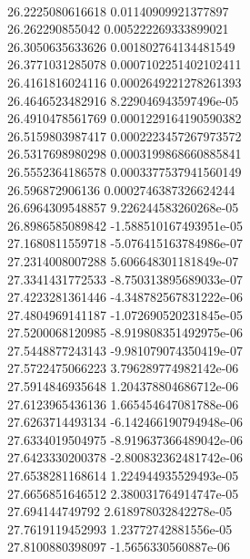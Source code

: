 { \\
26.2225080616618 0.01140909921377897
 \\
26.262290855042 0.005222269333899021
 \\
26.3050635633626 0.001802764134481549
 \\
26.3771031285078 0.0007102251402102411
 \\
26.4161816024116 0.0002649221278261393
 \\
26.4646523482916 8.229046943597496e-05
 \\
26.4910478561769 0.0001229164190590382
 \\
26.5159803987417 0.0002223457267973572
 \\
26.5317698980298 0.0003199868660885841
 \\
26.5552364186578 0.0003377537941560149
 \\
26.596872906136 0.0002746387326624244
 \\
26.6964309548857 9.226244583260268e-05
 \\
26.8986585089842 -1.588510167493951e-05
 \\
27.1680811559718 -5.076415163784986e-07
 \\
27.2314008007288 5.606648301181849e-07
 \\
27.3341431772533 -8.750313895689033e-07
 \\
27.4223281361446 -4.348782567831222e-06
 \\
27.4804969141187 -1.072690520231845e-05
 \\
27.5200068120985 -8.919808351492975e-06
 \\
27.5448877243143 -9.981079074350419e-07
 \\
27.5722475066223 3.796289774982142e-06
 \\
27.5914846935648 1.204378804686712e-06
 \\
27.6123965436136 1.665454647081788e-06
 \\
27.6263714493134 -6.142466190794948e-06
 \\
27.6334019504975 -8.919637366489042e-06
 \\
27.6423330200378 -2.800832362481742e-06
 \\
27.6538281168614 1.224944935529493e-05
 \\
27.6656851646512 2.380031764914747e-05
 \\
27.694144749792 2.618978032842278e-05
 \\
27.7619119452993 1.23772742881556e-05
 \\
27.8100880398097 -1.5656330560887e-06
 \\
}
